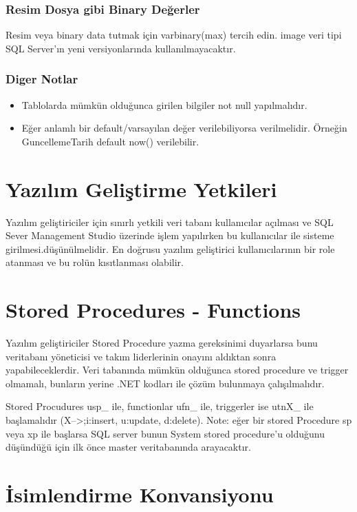 \documentclass[10pt,a4paper,draft]{article}
\begin{document}
\subsubsection{Resim Dosya gibi Binary Değerler}
Resim veya binary data tutmak için varbinary(max) tercih edin. image 
veri tipi SQL Server'ın yeni versiyonlarında kullanılmayacaktır.
 
\subsubsection{Diger Notlar}

\begin{itemize}
\item   Tablolarda mümkün olduğunca girilen bilgiler not null yapılmalıdır.
\item   Eğer anlamlı bir default/varsayılan değer verilebiliyorsa verilmelidir. Örneğin GuncellemeTarih default now() verilebilir.
\end{itemize}  			
  		 
  
\section{Yazılım Geliştirme Yetkileri}  									 
Yazılım geliştiriciler için sınırlı yetkili veri tabanı kullanıcılar açılması 
ve SQL Sever Management Studio üzerinde işlem yapılırken bu 
kullanıcılar ile sisteme girilmesi.düşünülmelidir.
En doğrusu yazılım geliştirici kullanıcılarının bir role atanması ve bu rolün kısıtlanması olabilir.

  	 
\section{Stored Procedures - Functions}  									 
Yazılım geliştiriciler Stored Procedure yazma gereksinimi duyarlarsa 
bunu veritabanı yöneticisi ve takım liderlerinin onayını	aldıktan sonra   yapabileceklerdir.
Veri tabanında mümkün olduğunca stored procedure ve trigger olmamalı,
bunların yerine .NET kodları ile çözüm bulunmaya çalışılmalıdır.


Stored Procudures usp\_ ile, functionlar ufn\_ ile, triggerler ise utnX\_ ile başlamalıdır (X-->;i:insert, u:update, d:delete). 			
Note: eğer bir stored Procedure sp veya xp ile başlarsa SQL server 
bunun System stored procedure'u olduğunu düşündüğü için ilk önce master veritabanında arayacaktır. 
  
  
\section{İsimlendirme Konvansiyonu}  
  
\end{document}
